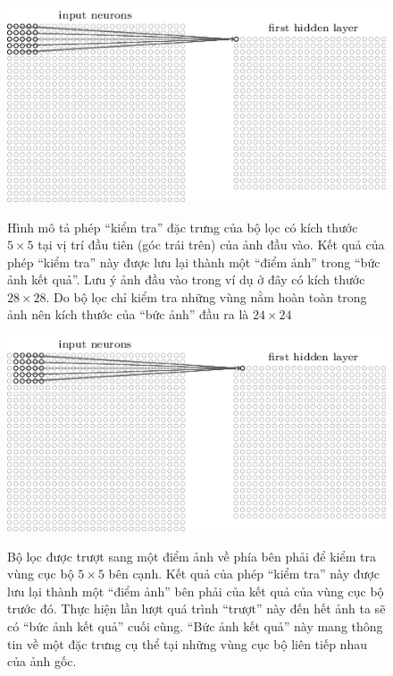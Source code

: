 	\begin{figure}
		\centering
		\includegraphics[width=\textwidth]{cnn_first_filter}
		\label{fig_cnn_filter}
		\caption[Phép tính đặc trưng của CNN]{Hình mô tả phép ``kiểm tra'' đặc trưng của bộ lọc có kích thước $5\times5$ tại vị trí đầu tiên (góc trái trên) của ảnh đầu vào.
		Kết quả của phép ``kiểm tra'' này được lưu lại thành một ``điểm ảnh'' trong ``bức ảnh kết quả''.
		Lưu ý ảnh đầu vào trong ví dụ ở đây có kích thước $28\times28$.
		Do bộ lọc chỉ kiểm tra những vùng nằm hoàn toàn trong ảnh nên kích thước của ``bức ảnh'' đầu ra là $24\times24$}
		
		\includegraphics[width=\textwidth]{cnn_second_filter}
		\label{fig_cnn_second_filter}
		\caption[Phép dịch chuyển bộ lọc của CNN]{Bộ lọc được trượt sang một điểm ảnh về phía bên phải để kiểm tra vùng cục bộ $5\times5$ bên cạnh.
		Kết quả của phép ``kiểm tra'' này được lưu lại thành một ``điểm ảnh'' bên phải của kết quả của vùng cục bộ trước đó.
		Thực hiện lần lượt quá trình ``trượt'' này đến hết ảnh ta sẽ có ``bức ảnh kết quả'' cuối cùng.
		``Bức ảnh kết quả'' này mang thông tin về một đặc trưng cụ thể tại những vùng cục bộ liên tiếp nhau của ảnh gốc.}
	\end{figure}
	
